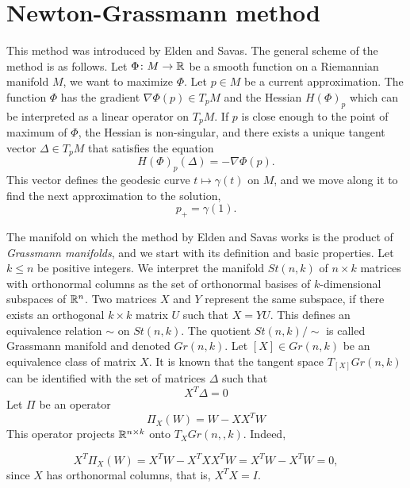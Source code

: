 \section{Newton-Grassmann method}

This method was introduced by Elden and Savas. 
The general scheme of the method is as follows.
Let $\Phi \colon M \to \mathbb{R}$ be a smooth function 
on a Riemannian manifold $M$, we want to maximize $\Phi$.
Let $p \in M$
be a current approximation. The function $\Phi$ has the gradient 
$\nabla \Phi (p) \in T_pM$ and the Hessian $H(\Phi)_p$
which can be interpreted as a linear operator on $T_pM$.
If $p$ is close enough to the point of maximum of $\Phi$,
the Hessian is non-singular, and there exists a unique tangent vector 
$\Delta \in T_pM$ that satisfies the equation
\begin{equation}
    \label{NewgrGeneral}
    H(\Phi)_p(\Delta) = - \nabla \Phi(p).
\end{equation}
This vector defines the geodesic curve $t \mapsto \gamma(t)$ on $M$,
and we move along it to find the next approximation to the solution,
\begin{equation}
p_{+} = \gamma(1).
\end{equation}


The manifold on which the method by Elden and Savas works is the product
of \textit{Grassmann manifolds}, and we start with its definition and basic properties.  Let $k \leq n$ be positive integers. We interpret the manifold $St(n, k)$
of $n \times k$ matrices with orthonormal columns
as the set of orthonormal basises of $k$-dimensional subspaces
of $\mathbb{R}^n$. Two matrices $X$ and $Y$ represent the same subspace,
if there exists an orthogonal $k \times k$ matrix $U$ such that
$X = YU$. This defines an equivalence relation $\sim$ on $St(n, k)$. The quotient $St(n, k)/ \sim$ is called
Grassmann manifold and denoted $Gr(n, k)$.
Let $[X] \in Gr(n,k)$ be an equivalence class of matrix $X$.
It is known that the tangent
space $T_{[X]}Gr(n, k)$ can be identified with the set of matrices $\Delta$
such that 
\begin{equation}
    X^T \Delta = 0
\end{equation}
Let $\Pi$ be an operator
\begin{equation}
    \Pi_X(W) = W - XX^TW
\end{equation}
This operator projects $\mathbb{R}^{n \times k}$ onto $T_XGr(n, ,k)$. Indeed,

\begin{equation}
    X^T \Pi_X(W) = X^T W - X^TXX^T W = X^TW - X^TW = 0,
\end{equation}
since $X$ has orthonormal columns, that is, $X^TX = I$.


